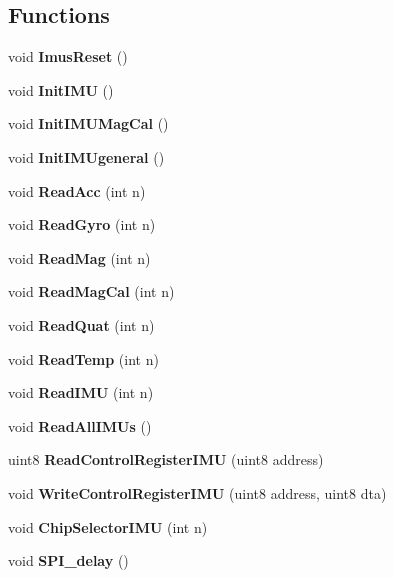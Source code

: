 \subsection*{Functions}
\begin{DoxyCompactItemize}
\item 
\mbox{\label{_i_m_u__functions_8h_a950a5a57e4188823c580d054ed2db16a}} 
void {\bfseries Imus\+Reset} ()
\item 
\mbox{\label{_i_m_u__functions_8h_ac4f81f61837e6a132dfceb5bb93b06fa}} 
void {\bfseries Init\+I\+MU} ()
\item 
\mbox{\label{_i_m_u__functions_8h_ac95975151b543b5265bc1e470aabf465}} 
void {\bfseries Init\+I\+M\+U\+Mag\+Cal} ()
\item 
\mbox{\label{_i_m_u__functions_8h_a83f0630cb5ff556322c8cf56b6c6afc0}} 
void {\bfseries Init\+I\+M\+Ugeneral} ()
\item 
\mbox{\label{_i_m_u__functions_8h_a0290185f5b71ddb96ea13ce0a1ff48e7}} 
void {\bfseries Read\+Acc} (int n)
\item 
\mbox{\label{_i_m_u__functions_8h_ab8ae2a28912ce4a548b3603e86b22ae9}} 
void {\bfseries Read\+Gyro} (int n)
\item 
\mbox{\label{_i_m_u__functions_8h_a2ee29250f51422fa3d76df77335cce26}} 
void {\bfseries Read\+Mag} (int n)
\item 
\mbox{\label{_i_m_u__functions_8h_aad3b4856a76c623025484fe5b931bdd4}} 
void {\bfseries Read\+Mag\+Cal} (int n)
\item 
\mbox{\label{_i_m_u__functions_8h_a8eeecefb2efe7e01711fb9448c31ae76}} 
void {\bfseries Read\+Quat} (int n)
\item 
\mbox{\label{_i_m_u__functions_8h_ab0883cd12ebf2937fd6da478ac3ab976}} 
void {\bfseries Read\+Temp} (int n)
\item 
\mbox{\label{_i_m_u__functions_8h_a45df9ddb73de250cebfa02bf1d72bd97}} 
void {\bfseries Read\+I\+MU} (int n)
\item 
\mbox{\label{_i_m_u__functions_8h_a27bf3026dfe4cb0d6d255decc9944d71}} 
void {\bfseries Read\+All\+I\+M\+Us} ()
\item 
\mbox{\label{_i_m_u__functions_8h_ac1f1dc30233302bf8c1955c56ae837ae}} 
uint8 {\bfseries Read\+Control\+Register\+I\+MU} (uint8 address)
\item 
\mbox{\label{_i_m_u__functions_8h_aa907fcabe23515e5a6fb4187dd652ec3}} 
void {\bfseries Write\+Control\+Register\+I\+MU} (uint8 address, uint8 dta)
\item 
\mbox{\label{_i_m_u__functions_8h_afae3632c7d21d6a41f6999eaabf7de07}} 
void {\bfseries Chip\+Selector\+I\+MU} (int n)
\item 
\mbox{\label{_i_m_u__functions_8h_a26f85d9c393e73879461861d2ac87379}} 
void {\bfseries S\+P\+I\+\_\+delay} ()
\end{DoxyCompactItemize}


